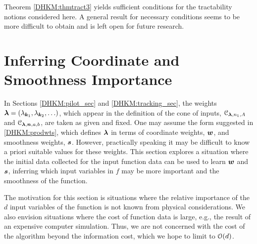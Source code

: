 \documentclass[USenglish]{article}
\theoremstyle{dgthm}
\theoremstyle{dgthm}
\theoremstyle{dgthm}
\theoremstyle{dgthm}
\theoremstyle{dgdef}
\theoremstyle{definition}
\begin{document}
Theorem \ref{DHKM:thmtract3} yields sufficient conditions for the tractability notions considered 
here. A general result for necessary conditions seems to be more difficult to obtain and is left open for future research.



\section{Inferring Coordinate and Smoothness Importance} \label{DHKM:smoothimportance_sec}

In Sections \ref{DHKM:pilot_sec} and \ref{DHKM:tracking_sec}, the weights ${\boldsymbol{\lambda}} = (\lambda_{{\boldsymbol{k}}_1}, \lambda_{{\boldsymbol{k}}_2}, \ldots )$, which appear in the definition of the cone of inputs, ${\mathcal{C}}_{{\boldsymbol{\lambda}},n_1,A}$ and ${\mathcal{C}}_{{\boldsymbol{\lambda}},{\boldsymbol{n}},a,b}$, are taken as given and fixed.  One may assume the form suggested in \eqref{DHKM:prodwts}, which defines ${\boldsymbol{\lambda}}$ in terms of coordinate weights, ${\boldsymbol{w}}$, and smoothness weights, ${\boldsymbol{s}}$.  However, practically speaking it may be difficult to know a priori suitable values for these weights.
This section explores a situation where the initial data collected for the input function data can be used to learn ${\boldsymbol{w}}$ and ${\boldsymbol{s}}$, inferring which input variables in $f$ may be more important and the smoothness of the function.  

The motivation for this section is situations where the relative importance of the $d$ input variables of the function is not known from physical considerations. We also envision situations where the cost of function data is large, e.g., the result of an expensive computer simulation.  Thus, we are not concerned with the cost of the algorithm beyond the information cost, which we hope to limit to ${\mathcal{O}}(d)$.
\end{document}
